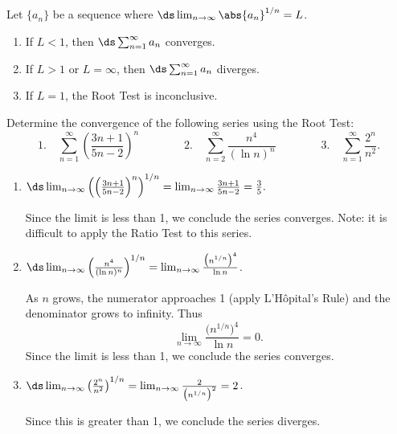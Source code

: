 \begin{theorem}\label{thm:root_test}
Let $\{a_n\}$ be a sequence %
where $\ds \lim_{n\to \infty}\abs{a_n}^{1/n} = L$.
	\begin{enumerate}
		\item If $L<1$, then $\ds\sum_{n=1}^\infty a_n$ converges.
		\item	If $L>1$ or $L=\infty$, then $\ds\sum_{n=1}^\infty a_n$ diverges.
		\item If $L=1$, the Root Test is inconclusive.
	\end{enumerate}
\end{theorem}


\begin{example}\label{ex_root1}
Determine the convergence of the following series using the Root Test:
\[
 \text{1.}\quad\sum_{n=1}^\infty \left(\frac{3n+1}{5n-2}\right)^n\qquad\qquad
 \text{2.}\quad\sum_{n=2}^\infty\frac{n^4}{(\ln n)^n}\qquad\qquad
 \text{3.}\quad\sum_{n=1}^\infty \frac{2^n}{n^2}.
\]
\solution
\begin{enumerate}
	\item	$\ds\lim_{n\to\infty} \left(\left(\frac{3n+1}{5n-2}\right)^n\right)^{1/n} = \lim_{n\to\infty} \frac{3n+1}{5n-2} = \frac 35.$ 
	
	Since the limit is less than 1, we conclude the series converges. Note: it is difficult to apply the Ratio Test to this series.
	
	\item	$\ds\lim_{n\to\infty} \left(\frac{n^4}{(\ln n)^n}\right)^{1/n} = \lim_{n\to\infty} \frac {\bigl(n^{1/n}\bigr)^4}{\ln n}  $. 
	
	As $n$ grows, the numerator approaches 1 (apply L'Hôpital's Rule) and the denominator grows to infinity.  Thus
	\[\lim_{n\to\infty} \frac{\bigl(n^{1/n}\bigr)^4}{\ln n} = 0.\]
	Since the limit is less than 1, we conclude the series converges.
	
	\item	$\ds \lim_{n\to\infty} \left(\frac{2^n}{n^2}\right)^{1/n} = \lim_{n\to\infty} \frac{2}{\bigl(n^{1/n}\bigr)^2} = 2$. 
	
	Since this is greater than 1, we conclude the series diverges.
\end{enumerate}
\end{example}

